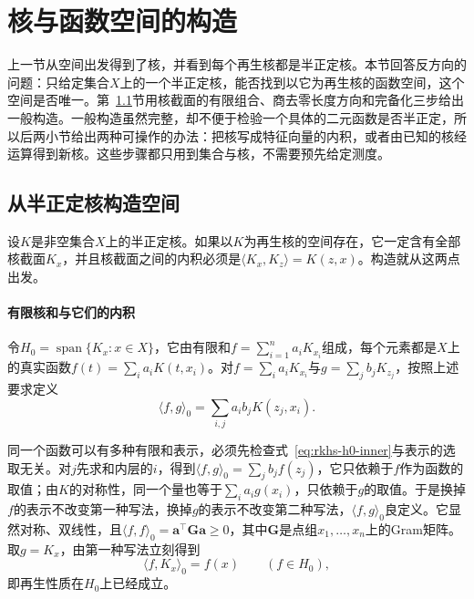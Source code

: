 
\section{核与函数空间的构造}
\label{sec:rkhs-construction}

上一节从空间出发得到了核，并看到每个再生核都是半正定核。本节回答反方向的问题：只给定集合$X$上的一个半正定核，能否找到以它为再生核的函数空间，这个空间是否唯一。第~\ref{sec:rkhs-from-kernel}节用核截面的有限组合、商去零长度方向和完备化三步给出一般构造。一般构造虽然完整，却不便于检验一个具体的二元函数是否半正定，所以后两小节给出两种可操作的办法：把核写成特征向量的内积，或者由已知的核经运算得到新核。这些步骤都只用到集合与核，不需要预先给定测度。

\subsection{从半正定核构造空间}
\label{sec:rkhs-from-kernel}

设$K$是非空集合$X$上的半正定核。如果以$K$为再生核的空间存在，它一定含有全部核截面$K_x$，并且核截面之间的内积必须是$\langle K_x,K_z\rangle=K(z,x)$。构造就从这两点出发。

\paragraph{有限核和与它们的内积}

令$H_0=\operatorname{span}\{K_x:x\in X\}$，它由有限和$f=\sum_{i=1}^na_iK_{x_i}$组成，每个元素都是$X$上的真实函数$f(t)=\sum_ia_iK(t,x_i)$。对$f=\sum_ia_iK_{x_i}$与$g=\sum_jb_jK_{z_j}$，按照上述要求定义
\begin{equation}
\langle f,g\rangle_0=\sum_{i,j}a_ib_jK(z_j,x_i).
\label{eq:rkhs-h0-inner}
\end{equation}

同一个函数可以有多种有限和表示，必须先检查式~\eqref{eq:rkhs-h0-inner}与表示的选取无关。对$j$先求和内层的$i$，得到$\langle f,g\rangle_0=\sum_jb_jf(z_j)$，它只依赖于$f$作为函数的取值；由$K$的对称性，同一个量也等于$\sum_ia_ig(x_i)$，只依赖于$g$的取值。于是换掉$f$的表示不改变第一种写法，换掉$g$的表示不改变第二种写法，$\langle f,g\rangle_0$良定义。它显然对称、双线性，且$\langle f,f\rangle_0=\bm a^{\top}\bm G\bm a\ge0$，其中$\bm G$是点组$x_1,\ldots,x_n$上的Gram矩阵。取$g=K_x$，由第一种写法立刻得到
\begin{equation}
\langle f,K_x\rangle_0=f(x)\qquad(f\in H_0),
\label{eq:rkhs-h0-reproducing}
\end{equation}
即再生性质在$H_0$上已经成立。

